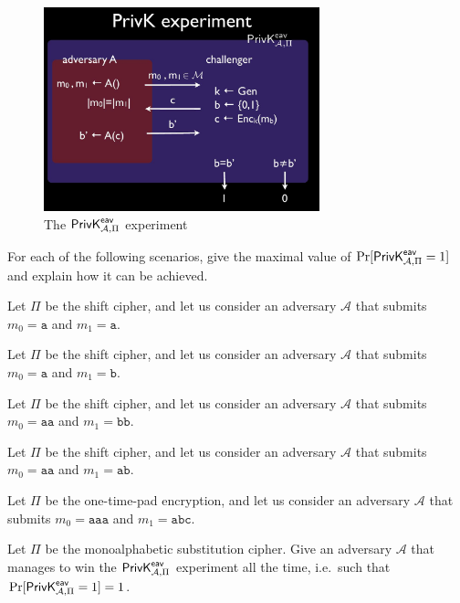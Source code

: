 \documentclass[a4paper,10pt,landscape,twocolumn]{scrartcl}
\begin{document}
\problems

%




\begin{figure}[h]
\center
\includegraphics[width=8cm]{PrivKexperiment.jpg}
\caption{The $\mathsf{PrivK}^{\mathsf{eav}}_{\mathcal{A},\Pi}$ experiment \label{fig}}
\end{figure}

\begin{exercise}
For each of the following scenarios, give the maximal value of $\Pr[\mathsf{PrivK}^{\mathsf{eav}}_{\mathcal{A},\Pi}=1]$ and explain how it can be achieved.

\begin{subex}
Let $\Pi$ be the shift cipher, and let us consider an adversary $\mathcal{A}$ that submits $m_0 = \mathtt{a}$ and $m_1 = \mathtt{a}$. 
\end{subex}

\begin{subex}
Let $\Pi$ be the shift cipher, and let us consider an adversary $\mathcal{A}$ that submits $m_0 = \mathtt{a}$ and $m_1 = \mathtt{b}$. 
\end{subex}

\begin{subex}
Let $\Pi$ be the shift cipher, and let us consider an adversary $\mathcal{A}$ that submits $m_0 = \mathtt{aa}$ and $m_1 = \mathtt{bb}$. 
\end{subex}

\begin{subex}
Let $\Pi$ be the shift cipher, and let us consider an adversary $\mathcal{A}$ that submits $m_0 = \mathtt{aa}$ and $m_1 = \mathtt{ab}$. 
\end{subex}

\begin{subex}
Let $\Pi$ be the one-time-pad encryption, and let us consider an adversary $\mathcal{A}$ that submits $m_0 = \mathtt{aaa}$ and $m_1 = \mathtt{abc}$. 
\end{subex}

\begin{subex}
Let $\Pi$ be the monoalphabetic substitution cipher. Give an adversary $\mathcal{A}$ that manages to win the $\mathsf{PrivK}^{\mathsf{eav}}_{\mathcal{A},\Pi}$ experiment all the time, i.e.\ such that $\Pr[\mathsf{PrivK}^{\mathsf{eav}}_{\mathcal{A},\Pi}=1] = 1$.
\end{subex}
\end{exercise}
\end{document}
